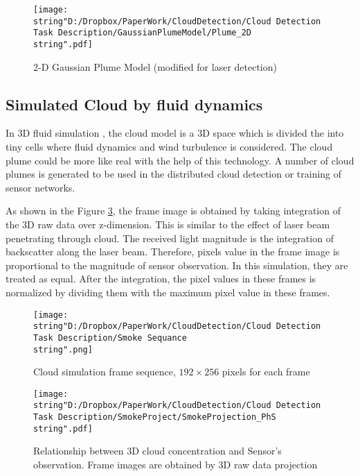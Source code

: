 \begin{figure}
\hfill{}\texttt{[image: \\string"D:/Dropbox/PaperWork/CloudDetection/Cloud Detection Task Description/GaussianPlumeModel/Plume\_2D\\string".pdf]}\hfill{}

\caption{\label{fig:2-D-Gaussian-Plume}2-D Gaussian Plume Model (modified
for laser detection)}
\end{figure}



\subsection{Simulated Cloud by fluid dynamics}

 In 3D fluid simulation \cite{He2011}, the cloud model is a 3D space
which is divided the into tiny cells where fluid dynamics and wind
turbulence is considered. The cloud plume could be more like real
with the help of this technology.  A number of cloud plumes is generated
to be used in the distributed cloud detection or training of sensor
networks. 

As shown in the Figure \ref{fig:Frame-projection}, the frame image
is obtained by taking integration of the 3D raw data over z-dimension.
This is similar to the effect of laser beam penetrating through cloud.
The received light magnitude is the integration of backscatter along
the laser beam. Therefore, pixels value in the frame image is proportional
to the magnitude of sensor observation. In this simulation, they are
treated as equal. After the integration, the pixel values in these
frames is normalized by dividing them with the maximum pixel value
in these frames.

\begin{figure}
\hfill{}\texttt{[image: \\string"D:/Dropbox/PaperWork/CloudDetection/Cloud Detection Task Description/Smoke Sequance\\string".png]}\hfill{}\hfill{}

\caption{\label{fig:Cloud-simulation-frame}Cloud simulation frame sequence,
$192\times256$ pixels for each frame}
\end{figure}


\begin{figure}
\hfill{}\texttt{[image: \\string"D:/Dropbox/PaperWork/CloudDetection/Cloud Detection Task Description/SmokeProject/SmokeProjection\_PhS\\string".pdf]}\hfill{}\hfill{}

\caption{\label{fig:Frame-projection}Relationship between 3D cloud concentration
and Sensor's observation. Frame images are obtained by 3D raw data
projection }
\end{figure}





